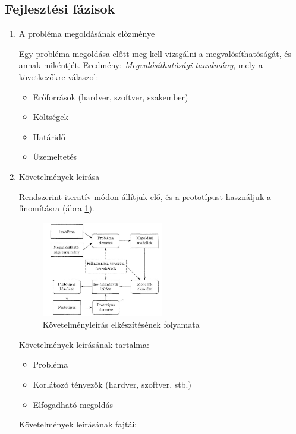 \documentclass[margin=0px]{article}
\begin{document}
	\subsection{Fejlesztési fázisok}
		\begin{enumerate}
			\item A probléma megoldásának előzménye
			
				Egy probléma megoldása előtt meg kell vizsgálni a megvalósíthatóságát, és annak mikéntjét. Eredmény: \textit{Megvalósíthatósági tanulmány}, mely a következőkre válaszol:
				\begin{itemize}
					\item Erőforrások (hardver, szoftver, szakember)
					\item Költségek
					\item Határidő
					\item Üzemeltetés
				\end{itemize}
			\item Követelmények leírása
			
				Rendszerint iteratív módon állítjuk elő, és a prototípust használjuk a finomításra (ábra \ref{fig:kovetelmenyleiras}).
				
				\begin{figure}[H]
						\centering
						\includegraphics[width=0.5\textwidth]{img/kovetelmenyleiras.png}
						\caption{Követelményleírás elkészítésének folyamata}
						\label{fig:kovetelmenyleiras}
				\end{figure}
				
				Követelmények leírásának tartalma:
				
				\begin{itemize}
					\item Probléma
					\item Korlátozó tényezők (hardver, szoftver, stb.)	
					\item Elfogadható megoldás
				\end{itemize}
				
				Követelmények leírásának fajtái:
				

\end{enumerate}
\end{document}

